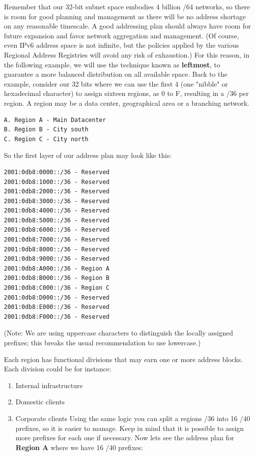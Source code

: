 \documentclass[
]{article}
\providecommand{\tightlist}{%
  \setlength{\itemsep}{0pt}\setlength{\parskip}{0pt}}
\begin{document}
Remember that our 32-bit subnet space embodies 4 billion /64 networks,
so there is room for good planning and management as there will be no
address shortage on any reasonable timescale. A good addressing plan
should always have room for future expansion and favor network
aggregation and management. (Of course, even IPv6 address space is not
infinite, but the policies applied by the various Regional Address
Registries will avoid any risk of exhaustion.) For this reason, in the
following example, we will use the technique known as \textbf{leftmost},
to guarantee a more balanced distribution on all available space. Back
to the example, consider our 32 bits where we can use the first 4 (one
"nibble" or hexadecimal character) to assign sixteen regions, as 0 to F,
resulting in a /36 per region. A region may be a data center,
geographical area or a branching network.

\begin{verbatim}
A. Region A - Main Datacenter
B. Region B - City south
C. Region C - City north
\end{verbatim}

So the first layer of our address plan may look like this:

\begin{verbatim}
2001:0db8:0000::/36 - Reserved
2001:0db8:1000::/36 - Reserved
2001:0db8:2000::/36 - Reserved
2001:0db8:3000::/36 - Reserved
2001:0db8:4000::/36 - Reserved
2001:0db8:5000::/36 - Reserved
2001:0db8:6000::/36 - Reserved
2001:0db8:7000::/36 - Reserved
2001:0db8:8000::/36 - Reserved
2001:0db8:9000::/36 - Reserved
2001:0db8:A000::/36 - Region A
2001:0db8:B000::/36 - Region B
2001:0db8:C000::/36 - Region C
2001:0db8:D000::/36 - Reserved
2001:0db8:E000::/36 - Reserved
2001:0db8:F000::/36 - Reserved
\end{verbatim}

(Note: We are using uppercase characters to distinguish the locally
assigned prefixes; this breaks the usual recommendation to use
lowercase.)

Each region has functional divisions that may earn one or more address
blocks. Each division could be for instance:

\begin{enumerate}
\def\labelenumi{\arabic{enumi}.}
\tightlist
\item
  Internal infrastructure
\item
  Domestic clients
\item
  Corporate clients Using the same logic you can split a
  region\textquotesingle s /36 into 16 /40 prefixes, so it is easier to
  manage. Keep in mind that it is possible to assign more prefixes for
  each one if necessary. Now let\textquotesingle s see the address plan
  for \textbf{Region A} where we have 16 /40 prefixes:
\end{enumerate}
\end{document}
